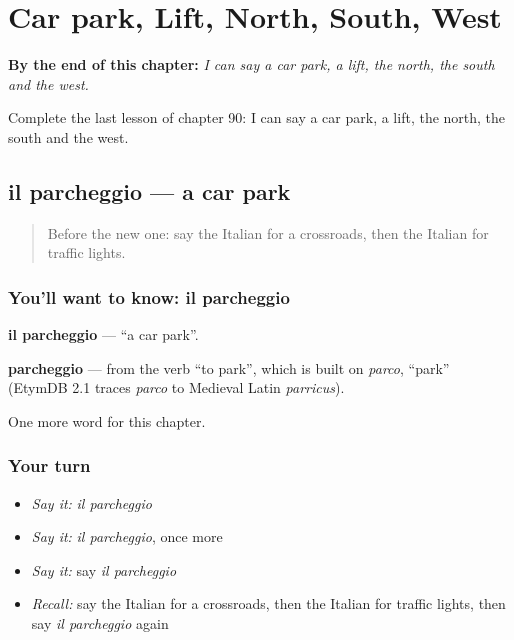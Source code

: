 
\chapter{Car park, Lift, North, South, West}
\label{ch:it-car-park-lift-north-south-west}

\begin{chapteropening}
\textbf{By the end of this chapter:} \emph{I can say a car park, a lift, the north, the south and the west.}

Complete the last lesson of chapter 90: I can say a car park, a lift, the north, the south and the west.
\end{chapteropening}

\section[il parcheggio]{il parcheggio — a car park}

\label{lesson:IT-C90-parcheggio}



\begin{quote}
Before the new one: say the Italian for a crossroads, then the Italian for traffic lights.
\end{quote}

\subsection*{You'll want to know: il parcheggio}
\textbf{il parcheggio} — \textquotedblleft{}a car park\textquotedblright{}.

\begin{cousinweb}
\textbf{parcheggio} — from the verb \textquotedblleft{}to park\textquotedblright{}, which is built on \emph{parco}, \textquotedblleft{}park\textquotedblright{} (EtymDB 2.1 traces \emph{parco} to Medieval Latin \emph{parricus}).
\end{cousinweb}

\begin{grammarlens}[title={What you've built}]
One more word for this chapter.
\end{grammarlens}

\subsection*{Your turn}
\begin{itemize}
\raggedright
  \item \emph{Say it:} \emph{il parcheggio}
  \item \emph{Say it:} \emph{il parcheggio}, once more
  \item \emph{Say it:} say \emph{il parcheggio}
  \item \emph{Recall:} say the Italian for a crossroads, then the Italian for traffic lights, then say \emph{il parcheggio} again
\end{itemize}

